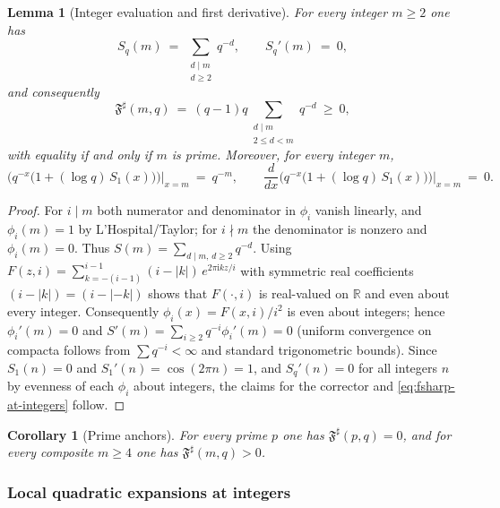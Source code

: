 \documentclass[11pt,a4paper]{amsart}
\newcommand{\ii}{\mathrm{i}}
\newcommand{\Fbase}{\mathfrak F}
\newcommand{\Fsharp}{\Fbase^{\sharp}}
\theoremstyle{plain}
\newtheorem{lemma}[theorem]{Lemma}
\newtheorem{corollary}[theorem]{Corollary}
\theoremstyle{definition}
\theoremstyle{remark}
\begin{document}
\begin{lemma}[Integer evaluation and first derivative]\label{lem:int-values}
For every integer $m\ge2$ one has
\[
S_q(m)\ =\ \sum_{\substack{d\mid m\\ d\ge 2}} q^{-d},
\qquad
S_q'(m)\ =\ 0,
\]
and consequently
\begin{equation}\label{eq:fsharp-at-integers}
\Fsharp(m,q)\ =\ (q-1)q\!\sum_{\substack{d\mid m\\ 2\le d<m}} q^{-d}\ \ge\ 0,
\end{equation}
with equality if and only if $m$ is prime. Moreover, for every integer $m$,
\[
\big(q^{-x}\bigl(1+(\log q)\,S_1(x)\bigr)\big)\Big|_{x=m}\ =\ q^{-m},
\qquad
\frac{d}{dx}\Big(q^{-x}\bigl(1+(\log q)\,S_1(x)\bigr)\Big)\Big|_{x=m}\ =\ 0.
\]
\end{lemma}


\begin{proof}
For $i\mid m$ both numerator and denominator in $\phi_i$ vanish linearly, and $\phi_i(m)=1$ by L’Hospital/Taylor; for $i\nmid m$ the denominator is nonzero and $\phi_i(m)=0$. Thus $S(m)=\sum_{d\mid m,\,d\ge2}q^{-d}$. Using $F(z,i)=\sum_{k=-(i-1)}^{i-1}(i-|k|)\,e^{2\pi \ii k z/i}$ with symmetric real coefficients $(i-|k|)=(i-|{-}k|)$ shows that $F(\cdot,i)$ is real-valued on $\mathbb R$ and even about every integer. Consequently $\phi_i(x)=F(x,i)/i^2$ is even about integers; hence $\phi_i'(m)=0$ and $S'(m)=\sum_{i\ge2}q^{-i}\phi_i'(m)=0$ (uniform convergence on compacta follows from $\sum q^{-i}<\infty$ and standard trigonometric bounds). Since $S_1(n)=0$ and $S_1'(n)=\cos(2\pi n)=1$, and $S_q'(n)=0$ for all integers $n$ by evenness of each $\phi_i$ about integers, the claims for the corrector and \eqref{eq:fsharp-at-integers} follow.
\end{proof}

\begin{corollary}[Prime anchors]\label{cor:prime-anchors}
For every prime $p$ one has $\Fsharp(p,q)=0$, and for every composite $m\ge4$ one has $\Fsharp(m,q)>0$.
\end{corollary}

\subsubsection{Local quadratic expansions at integers}
\end{document}
